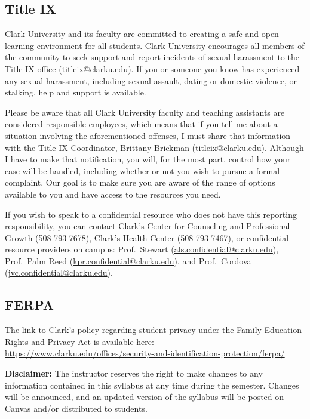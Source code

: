 \documentclass[11pt]{article}
\begin{document}
\subsection{Title IX}\hspace{0pt}\par
Clark University and its faculty are committed to creating a safe and open
learning environment for all students. Clark University encourages all members of
the community to seek support and report incidents of sexual harassment to the
Title IX office (\href{mailto:titleix@clarku.edu}{titleix@clarku.edu}). If you or
someone you know has experienced any sexual harassment, including sexual assault,
dating or domestic violence, or stalking, help and support is available.

Please be aware that all Clark University faculty and teaching assistants are
considered responsible employees, which means that if you tell me about a
situation involving the aforementioned offenses, I must share that information
with the Title IX Coordinator, Brittany Brickman
(\href{mailto:titleix@clarku.edu}{titleix@clarku.edu}). Although I have to make
that notification, you will, for the most part, control how your case will be
handled, including whether or not you wish to pursue a formal complaint. Our goal
is to make sure you are aware of the range of options available to you and have
access to the resources you need.

If you wish to speak to a confidential resource who does not have this reporting
responsibility, you can contact Clark's Center for Counseling and Professional
Growth (508-793-7678), Clark's Health Center (508-793-7467), or confidential
resource providers on campus: Prof.\ Stewart
(\href{mailto:als.confidential@clarku.edu}{als.confidential@clarku.edu}), Prof.\
Palm Reed
(\href{mailto:kpr.confidential@clarku.edu}{kpr.confidential@clarku.edu}), and
Prof.\ Cordova
(\href{mailto:jvc.confidential@clarku.edu}{jvc.confidential@clarku.edu}).

\subsection{FERPA}\hspace{0pt}\par
The link to Clark's policy regarding student privacy under the Family Education
Rights and Privacy Act is available here:
\url{https://www.clarku.edu/offices/security-and-identification-protection/ferpa/}

\vspace{1em}
\textbf{Disclaimer:} The instructor reserves the right to make changes to any
information contained in this syllabus at any time during the semester. Changes
will be announced, and an updated version of the syllabus will be posted on
Canvas and/or distributed to students.
\end{document}
